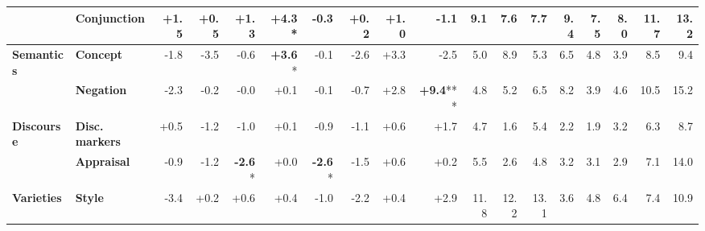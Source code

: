 \begin{table}[h]
{\begin{tabular}{llrrrrrrrrrrrrrrrr}
  & \textbf{Conjunction} & \cellcolor{green!3} +1.5 & \cellcolor{green!1} +0.5 & \cellcolor{green!2} +1.3 & \cellcolor{green!8} \textbf{+4.3}* & \cellcolor{red!0} -0.3 & \cellcolor{green!0} +0.2 & \cellcolor{green!1} +1.0 & \cellcolor{red!2} -1.1 & \cellcolor{blue!24} 9.1 & \cellcolor{blue!20} 7.6 & \cellcolor{blue!20} 7.7 & \cellcolor{blue!24} 9.4 & \cellcolor{blue!19} 7.5 & \cellcolor{blue!21} 8.0 & \cellcolor{blue!30} 11.7 & \cellcolor{blue!34} 13.2 \\
\midrule
\textbf{Semantics} & \textbf{Concept} & \cellcolor{red!3} -1.8 & \cellcolor{red!6} -3.5 & \cellcolor{red!1} -0.6 & \cellcolor{green!7} \textbf{+3.6}* & \cellcolor{red!0} -0.1 & \cellcolor{red!5} -2.6 & \cellcolor{green!6} +3.3 & \cellcolor{red!4} -2.5 & \cellcolor{blue!13} 5.0 & \cellcolor{blue!23} 8.9 & \cellcolor{blue!14} 5.3 & \cellcolor{blue!17} 6.5 & \cellcolor{blue!12} 4.8 & \cellcolor{blue!10} 3.9 & \cellcolor{blue!22} 8.5 & \cellcolor{blue!24} 9.4 \\
  & \textbf{Negation} & \cellcolor{red!4} -2.3 & \cellcolor{red!0} -0.2 & \cellcolor{red!0} -0.0 & \cellcolor{green!0} +0.1 & \cellcolor{red!0} -0.1 & \cellcolor{red!1} -0.7 & \cellcolor{green!5} +2.8 & \cellcolor{green!18} \textbf{+9.4}*** & \cellcolor{blue!12} 4.8 & \cellcolor{blue!14} 5.2 & \cellcolor{blue!17} 6.5 & \cellcolor{blue!21} 8.2 & \cellcolor{blue!10} 3.9 & \cellcolor{blue!12} 4.6 & \cellcolor{blue!27} 10.5 & \cellcolor{blue!39} 15.2 \\
\midrule
\textbf{Discourse} & \textbf{Disc. markers} & \cellcolor{green!1} +0.5 & \cellcolor{red!2} -1.2 & \cellcolor{red!2} -1.0 & \cellcolor{green!0} +0.1 & \cellcolor{red!1} -0.9 & \cellcolor{red!2} -1.1 & \cellcolor{green!1} +0.6 & \cellcolor{green!3} +1.7 & \cellcolor{blue!12} 4.7 & \cellcolor{blue!4} 1.6 & \cellcolor{blue!14} 5.4 & \cellcolor{blue!6} 2.2 & \cellcolor{blue!5} 1.9 & \cellcolor{blue!8} 3.2 & \cellcolor{blue!16} 6.3 & \cellcolor{blue!22} 8.7 \\
  & \textbf{Appraisal} & \cellcolor{red!1} -0.9 & \cellcolor{red!2} -1.2 & \cellcolor{red!5} \textbf{-2.6}* & \cellcolor{green!0} +0.0 & \cellcolor{red!5} \textbf{-2.6}* & \cellcolor{red!3} -1.5 & \cellcolor{green!1} +0.6 & \cellcolor{green!0} +0.2 & \cellcolor{blue!14} 5.5 & \cellcolor{blue!7} 2.6 & \cellcolor{blue!12} 4.8 & \cellcolor{blue!8} 3.2 & \cellcolor{blue!8} 3.1 & \cellcolor{blue!8} 2.9 & \cellcolor{blue!18} 7.1 & \cellcolor{blue!36} 14.0 \\
\midrule
\textbf{Varieties} & \textbf{Style} & \cellcolor{red!6} -3.4 & \cellcolor{green!0} +0.2 & \cellcolor{green!1} +0.6 & \cellcolor{green!0} +0.4 & \cellcolor{red!2} -1.0 & \cellcolor{red!4} -2.2 & \cellcolor{green!0} +0.4 & \cellcolor{green!5} +2.9 & \cellcolor{blue!30} 11.8 & \cellcolor{blue!32} 12.2 & \cellcolor{blue!34} 13.1 & \cellcolor{blue!9} 3.6 & \cellcolor{blue!12} 4.8 & \cellcolor{blue!17} 6.4 & \cellcolor{blue!19} 7.4 & \cellcolor{blue!28} 10.9 \\

\end{tabular}}
\end{table}
